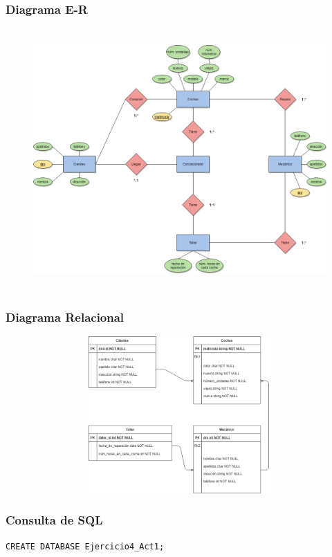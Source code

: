 \documentclass[a4paper, 12pt]{article}
\begin{document}
\begin{justify}
        \subsubsection{Diagrama E-R}
        \begin{figure}[H]
            \centering
            \includegraphics[width=16cm,height=10cm]{er4.png}
        \end{figure}
        \subsubsection{Diagrama Relacional}
        \begin{figure}[H]
            \centering
            \includegraphics[width=16cm,height=6cm]{rel4.png}
        \end{figure}
        \subsubsection{Consulta de SQL}
\begin{verbatim}
CREATE DATABASE Ejercicio4_Act1;


\end{verbatim}
\end{justify}
\end{document}
